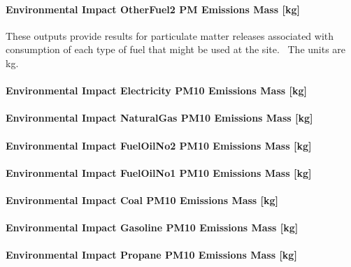 \paragraph{Environmental Impact OtherFuel2 PM Emissions Mass {[}kg{]}}\label{environmental-impact-otherfuel2-pm-emissions-mass-kg}

These outputs provide results for particulate matter releases associated with consumption of each type of fuel that might be used at the site.~ The units are kg.

\paragraph{Environmental Impact Electricity PM10 Emissions Mass {[}kg{]}}\label{environmental-impact-electricity-pm10-emissions-mass-kg}

\paragraph{Environmental Impact NaturalGas PM10 Emissions Mass {[}kg{]}}\label{environmental-impact-natural-gas-pm10-emissions-mass-kg}

\paragraph{Environmental Impact FuelOilNo2 PM10 Emissions Mass {[}kg{]}}\label{environmental-impact-fuel-oil-2-pm10-emissions-mass-kg}

\paragraph{Environmental Impact FuelOilNo1 PM10 Emissions Mass {[}kg{]}}\label{environmental-impact-fuel-oil-1-pm10-emissions-mass-kg}

\paragraph{Environmental Impact Coal PM10 Emissions Mass {[}kg{]}}\label{environmental-impact-coal-pm10-emissions-mass-kg}

\paragraph{Environmental Impact Gasoline PM10 Emissions Mass {[}kg{]}}\label{environmental-impact-gasoline-pm10-emissions-mass-kg}

\paragraph{Environmental Impact Propane PM10 Emissions Mass {[}kg{]}}\label{environmental-impact-propane-pm10-emissions-mass-kg}

